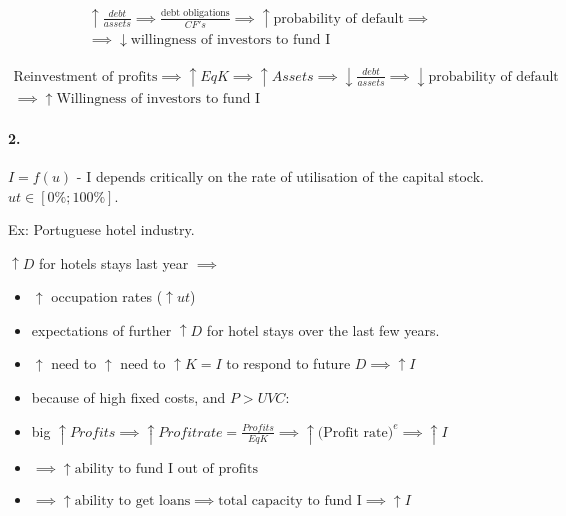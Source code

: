\documentclass{report}
\begin{document}
\begin{multline*}
    \uparrow \frac{debt}{assets}\implies\frac{\text{debt obligations}}{CF's} \implies \uparrow \text{probability of default} \implies \\ \implies \downarrow \text{willingness of investors to fund I}
\end{multline*}

\begin{multline}
    \text{Reinvestment of profits} \implies \uparrow EqK \implies \uparrow Assets \implies \downarrow \frac{debt}{assets} \implies \downarrow \text{probability of default} \\ 
    \implies \uparrow \text{Willingness of investors to fund I}
\end{multline}

\paragraph{2.} $I=f(u)$ - I depends critically on the rate of utilisation of the capital stock. $ut\in[0\%; 100\%]$. 

Ex: Portuguese hotel industry. 

$\uparrow D$ for hotels stays last year $\implies$ 
    \begin{itemize}
    
       \item $\uparrow$ occupation rates ($\uparrow ut$)
       
       \item expectations of further $\uparrow D$ for hotel stays over the last few years. 
       \item $\uparrow$ need to $\uparrow$ need to $\uparrow K=I$ to respond to future $D \implies \uparrow I$
           \item because of high fixed costs, and $P>UVC$:

    \end{itemize}
    \begin{itemize}
        \item big $\uparrow Profits \implies \uparrow Profit rate=\frac{Profits}{EqK} \implies \uparrow \big( \text{Profit rate} \big)^e\implies \uparrow I$
        \item $\implies \uparrow \text{ability to fund I out of profits}$
        \item $\implies \uparrow \text{ability to get loans} \implies \text{total capacity to fund I} \implies \uparrow I$
    \end{itemize}
\end{document}
